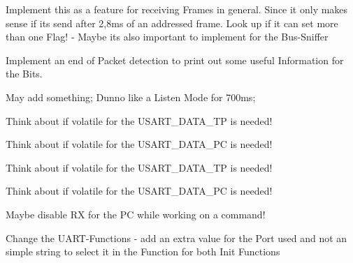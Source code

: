 
\begin{DoxyRefList}
\item[\label{todo__todo000004}%
\hypertarget{todo__todo000004}{}%
Global \hyperlink{shell_8h_a7b264b3bfe53d649c5b7653cfd97033d}{ack\+Info} (void)]Implement this as a feature for receiving Frames in general. Since it only makes sense if its send after 2,8ms of an addressed frame. Look up if it can set more than one Flag! -\/ Maybe its also important to implement for the Bus-\/\+Sniffer 
\item[\label{todo__todo000002}%
\hypertarget{todo__todo000002}{}%
Global \hyperlink{shell_8h_ad95c9c45c97cc744ca49a98494bf9465}{act\+\_\+busmon} (void)]Implement an end of Packet detection to print out some useful Information for the Bits. 
\item[\label{todo__todo000003}%
\hypertarget{todo__todo000003}{}%
Global \hyperlink{shell_8h_a5c364cd022ec191bccd57afa8aae1e89}{act\+\_\+busymode} (void)]May add something; Dunno like a Listen Mode for 700ms;  
\item[\label{todo__todo000009}%
\hypertarget{todo__todo000009}{}%
Global \hyperlink{_u_a_r_t_8c_abbfd0611f43db59ea4fdb1ea434cf017}{I\+SR} (U\+S\+A\+R\+T\+C0\+\_\+\+D\+R\+E\+\_\+vect)]Think about if volatile for the U\+S\+A\+R\+T\+\_\+\+D\+A\+T\+A\+\_\+\+TP is needed! 
\item[\label{todo__todo000011}%
\hypertarget{todo__todo000011}{}%
Global \hyperlink{_u_a_r_t_8c_acdf978f69a52b8a2225b0536b5fbff0e}{I\+SR} (U\+S\+A\+R\+T\+C1\+\_\+\+D\+R\+E\+\_\+vect)]Think about if volatile for the U\+S\+A\+R\+T\+\_\+\+D\+A\+T\+A\+\_\+\+PC is needed! 
\item[\label{todo__todo000008}%
\hypertarget{todo__todo000008}{}%
Global \hyperlink{_u_a_r_t_8c_aace195abde7bc36b7b50772ff2277dd4}{I\+SR} (U\+S\+A\+R\+T\+C0\+\_\+\+R\+X\+C\+\_\+vect)]Think about if volatile for the U\+S\+A\+R\+T\+\_\+\+D\+A\+T\+A\+\_\+\+TP is needed! 
\item[\label{todo__todo000010}%
\hypertarget{todo__todo000010}{}%
Global \hyperlink{_u_a_r_t_8c_a6c9949e5146d1feb028b0c2db8754523}{I\+SR} (U\+S\+A\+R\+T\+C1\+\_\+\+R\+X\+C\+\_\+vect)]Think about if volatile for the U\+S\+A\+R\+T\+\_\+\+D\+A\+T\+A\+\_\+\+PC is needed!  
\item[\label{todo__todo000001}%
\hypertarget{todo__todo000001}{}%
File \hyperlink{shell_8c}{shell.c} ]Maybe disable RX for the PC while working on a command!  
\item[\label{todo__todo000005}%
\hypertarget{todo__todo000005}{}%
File \hyperlink{_u_a_r_t_8c}{U\+A\+RT.c} ]Change the U\+A\+R\+T-\/\+Functions -\/ add an extra value for the Port used and not an simple string to select it in the Function for both Init Functions  

\end{DoxyRefList}
